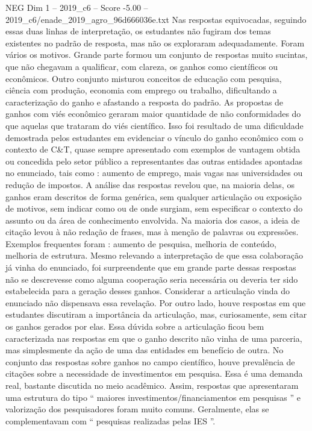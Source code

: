 \begin{textsample}{NEG Dim 1 – 2019\_c6 – Score -5.00 – 2019\_c6/enade\_2019\_agro\_96d666036e.txt}
Nas respostas equivocadas, seguindo essas duas linhas de interpretação, os estudantes não fugiram dos temas existentes no padrão de resposta, mas não os exploraram adequadamente.
Foram vários os motivos.
Grande parte formou um conjunto de respostas muito sucintas, que não chegavam a qualificar, com clareza, os ganhos como científicos ou econômicos.
Outro conjunto misturou conceitos de educação com pesquisa, ciência com produção, economia com emprego ou trabalho, dificultando a caracterização do ganho e afastando a resposta do padrão.
As propostas de ganhos com viés econômico geraram maior quantidade de não conformidades do que aquelas que trataram do viés científico.
Isso foi resultado de uma dificuldade demostrada pelos estudantes em evidenciar o vínculo do ganho econômico com o contexto de C\&T, quase sempre apresentado com exemplos de vantagem obtida ou concedida pelo setor público a representantes das outras entidades apontadas no enunciado, tais como : aumento de emprego, mais vagas nas universidades ou redução de impostos.
A análise das respostas revelou que, na maioria delas, os ganhos eram descritos de forma genérica, sem qualquer articulação ou exposição de motivos, sem indicar como ou de onde surgiam, sem especificar o contexto do assunto ou da área de conhecimento envolvida.
Na maioria dos casos, a ideia de citação levou à não redação de frases, mas à menção de palavras ou expressões.
Exemplos frequentes foram : aumento de pesquisa, melhoria de conteúdo, melhoria de estrutura.
Mesmo relevando a interpretação de que essa colaboração já vinha do enunciado, foi surpreendente que em grande parte dessas respostas não se descrevesse como alguma cooperação seria necessária ou deveria ter sido estabelecida para a geração desses ganhos.
Considerar a articulação vinda do enunciado não dispensava essa revelação.
Por outro lado, houve respostas em que estudantes discutiram a importância da articulação, mas, curiosamente, sem citar os ganhos gerados por elas.
Essa dúvida sobre a articulação ficou bem caracterizada nas respostas em que o ganho descrito não vinha de uma parceria, mas simplesmente da ação de uma das entidades em benefício de outra.
No conjunto das respostas sobre ganhos no campo científico, houve prevalência de citações sobre a necessidade de investimentos em pesquisa.
Essa é uma demanda real, bastante discutida no meio acadêmico.
Assim, respostas que apresentaram uma estrutura do tipo “ maiores investimentos/financiamentos em pesquisas ” e valorização dos pesquisadores foram muito comuns.
Geralmente, elas se complementavam com “ pesquisas realizadas pelas IES ”.

\end{textsample}
